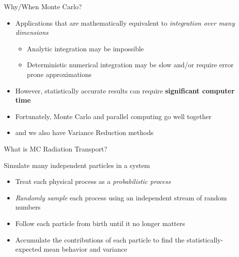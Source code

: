 \documentclass[xcolor=x11names,compress]{beamer}
\renewcommand{\(}{\begin{columns}}
\renewcommand{\)}{\end{columns}}
\newcommand{\<}[1]{\begin{column}{#1}}
\renewcommand{\>}{\end{column}}
\begin{document}
\begin{frame}{Why/When Monte Carlo?}

\begin{itemize}
\item Applications that are mathematically equivalent to \textit{integration over many dimensions}
\vspace*{0.25 em}
\begin{itemize}
\item Analytic integration may be impossible
\vspace*{0.25 em}
\item Deterministic numerical integration may be slow and/or require error prone approximations
\end{itemize} 
\vspace*{0.5 em}

\item However, statistically accurate results can require \textbf{significant computer time}
\item Fortunately, Monte Carlo and parallel computing go well together
\item and we also have Variance Reduction methods
\end{itemize}

\end{frame}


\begin{frame}{What is MC Radiation Transport?}

Simulate many independent particles in a system
\begin{itemize}
\item Treat each physical process as a
\textit{probabilistic process}

\item \textit{Randomly sample} each process using an
independent stream of random numbers

\item Follow each particle from birth until it no
longer matters

\item Accumulate the contributions of each
particle to find the statistically-expected
mean behavior and variance
\end{itemize}

\end{frame}
\end{document}
